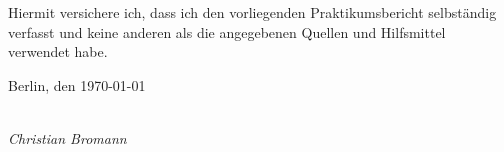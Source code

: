 %
%

\newpage

\thispagestyle{empty}

\begin{large}

\vspace*{1cm}

\noindent
Hiermit versichere ich, dass ich den vorliegenden Praktikumsbericht
selbständig verfasst und keine anderen als die angegebenen Quellen
und Hilfsmittel verwendet habe.

\vspace{2cm}

\noindent
Berlin, den \today

\vspace{3cm}

\hspace*{7cm}%
\dotfill\\
\hspace*{9.5cm}%
\textit{Christian Bromann}

\end{large}
